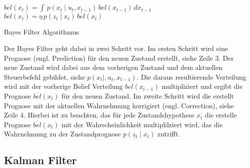 
\begin{algorithm}
\begin{onehalfspacing}
	\DontPrintSemicolon
	{
		{
			$\overline{bel}(x_t) = \int \, p(x_t \mid u_t, x_{t-1}) \, bel(x_{t-1}) \, dx_{t-1}$\;
			$bel(x_t) = \eta \, p(z_t \mid x_t) \, \overline{bel}(x_t)$\;
		}
	}
\caption{Bayes Filter Algorithmus}
\label{alg:algorithm_bayes_filter}
\end{onehalfspacing}
\end{algorithm}

Der Bayes Filter geht dabei in zwei Schritt vor. Im ersten Schritt wird eine Prognose (engl. Prediction) für den neuen Zustand erstellt, siehe Zeile 3. Der neue Zustand wird dabei aus dem vorherigen Zustand und dem aktuellen Steuerbefehl gebildet, siehe $p(x_t \mid, u_t, x_{t-1})$. Die daraus resultierende Verteilung wird mit der vorherige Belief Verteilung $bel(x_{t-1})$ multipliziert und ergibt die Prognose $\overline{bel}(x_t)$ für den neuen Zustand. Im zweite Schritt wird die erstellt Prognose mit der aktuellen Wahrnehmung korrigiert (engl. Correction), siehe Zeile 4. Hierbei ist zu beachten, das für jede Zustandshypothese $x_t$ die erstelle Prognose $\overline{bel}(x_t)$ mit der Wahrscheinlichkeit multiplilziert wird, das die Wahrnehmung zu der Zustandprognose $p(z_t \mid x_t)$ zutrifft.


%
%
\subsection{Kalman Filter}

